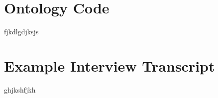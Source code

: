 \begin{appendices}
\chapter{Ontology Code}
fjkdlgdjksjs
\chapter{Example Interview Transcript}
ghjkshfjkh
\end{appendices}